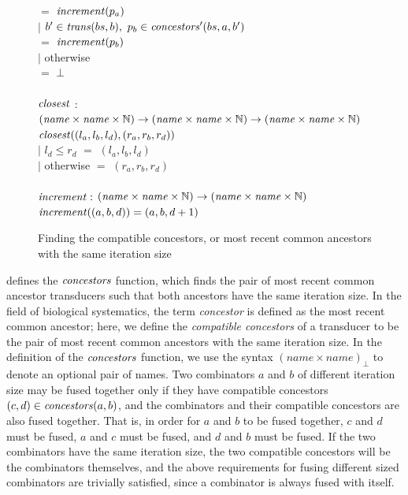 \begin{figure}
\begin{tabbing}
        \>     \>                      \> $=$ \> $\mathit{increment}(p_a)$ \\
        \> $|$ \> $b' \in \mathit{trans}(bs,b),~ p_b \in \mathit{concestors}'(bs,a,b')$ \\
        \>     \>                      \> $=$ \> $\mathit{increment}(p_b)$ \\
        \> $|$ \> otherwise            \\
        \>     \>                      \> $=$    \> $\bot$
\\
\\
$\mathit{closest}$ \> $:$ \> $(\mathit{name} \times \mathit{name} \times \mathbb{N}) \to (\mathit{name} \times \mathit{name} \times \mathbb{N}) \to (\mathit{name} \times \mathit{name} \times \mathbb{N})$ \\
$\mathit{closest}((l_a,l_b,l_d), (r_a,r_b,r_d))$ \\
        \> $|$ \> $l_d \le r_d$ \> \> \> $=$ \> $(l_a,l_b,l_d)$ \\
        \> $|$ \> otherwise     \> \> \> $=$ \> $(r_a,r_b,r_d)$ \\
\\
$\mathit{increment} :$ \> \> $(\mathit{name} \times \mathit{name} \times \mathbb{N}) \to (\mathit{name} \times \mathit{name} \times \mathbb{N})$ \\
$\mathit{increment}((a,b,d)) = (a,b,d+1)$ \\
\end{tabbing}

\caption{Finding the compatible concestors, or most recent common ancestors with the same iteration size}
\label{fig:clustering:concestors}
\end{figure}

 defines the $\mathit{concestors}$ function, which finds the pair of most recent common ancestor transducers such that both ancestors have the same iteration size.
In the field of biological systematics, the term \emph{concestor} is defined as the most recent common ancestor; here, we define the \emph{compatible concestors} of a transducer to be the pair of most recent common ancestors with the same iteration size.
In the definition of the $\mathit{concestors}$ function, we use the syntax $(name \times name)_\bot$ to denote an optional pair of names.
Two combinators $a$ and $b$ of different iteration size may be fused together only if they have compatible concestors $(c, d) \in \mathit{concestors}(a,b)$, and the combinators and their compatible concestors are also fused together.
That is, in order for $a$ and $b$ to be fused together, $c$ and $d$ must be fused, $a$ and $c$ must be fused, and $d$ and $b$ must be fused.
If the two combinators have the same iteration size, the two compatible concestors will be the combinators themselves, and the above requirements for fusing different sized combinators are trivially satisfied, since a combinator is always fused with itself.

